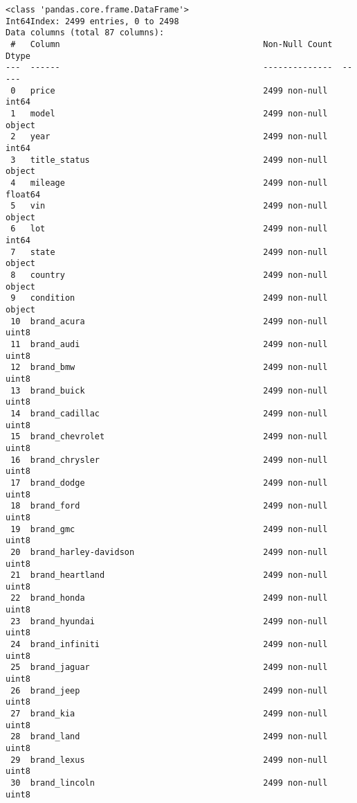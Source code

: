 \documentclass[11pt]{article}
\begin{document}
\begin{verbatim}
<class 'pandas.core.frame.DataFrame'>
Int64Index: 2499 entries, 0 to 2498
Data columns (total 87 columns):
 #   Column                                         Non-Null Count  Dtype  
---  ------                                         --------------  -----  
 0   price                                          2499 non-null   int64  
 1   model                                          2499 non-null   object 
 2   year                                           2499 non-null   int64  
 3   title_status                                   2499 non-null   object 
 4   mileage                                        2499 non-null   float64
 5   vin                                            2499 non-null   object 
 6   lot                                            2499 non-null   int64  
 7   state                                          2499 non-null   object 
 8   country                                        2499 non-null   object 
 9   condition                                      2499 non-null   object 
 10  brand_acura                                    2499 non-null   uint8  
 11  brand_audi                                     2499 non-null   uint8  
 12  brand_bmw                                      2499 non-null   uint8  
 13  brand_buick                                    2499 non-null   uint8  
 14  brand_cadillac                                 2499 non-null   uint8  
 15  brand_chevrolet                                2499 non-null   uint8  
 16  brand_chrysler                                 2499 non-null   uint8  
 17  brand_dodge                                    2499 non-null   uint8  
 18  brand_ford                                     2499 non-null   uint8  
 19  brand_gmc                                      2499 non-null   uint8  
 20  brand_harley-davidson                          2499 non-null   uint8  
 21  brand_heartland                                2499 non-null   uint8  
 22  brand_honda                                    2499 non-null   uint8  
 23  brand_hyundai                                  2499 non-null   uint8  
 24  brand_infiniti                                 2499 non-null   uint8  
 25  brand_jaguar                                   2499 non-null   uint8  
 26  brand_jeep                                     2499 non-null   uint8  
 27  brand_kia                                      2499 non-null   uint8  
 28  brand_land                                     2499 non-null   uint8  
 29  brand_lexus                                    2499 non-null   uint8  
 30  brand_lincoln                                  2499 non-null   uint8  

\end{verbatim}
\end{document}
